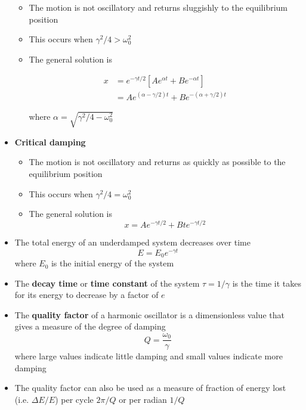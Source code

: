 \documentclass{article}
\begin{document}
\begin{itemize}
        \begin{itemize}
          \item The motion is not oscillatory and returns sluggishly to the equilibrium position

          \item This occurs when $\gamma^2 / 4 > \omega_0^2$

          \item The general solution is

                \begin{align*}
                  x & = e^{-\gamma t / 2} [A e^{\alpha t} + B e^{-\alpha t}]           \\
                    & = A e^{(\alpha - \gamma / 2) t} + B e^{-(\alpha + \gamma / 2) t}
                \end{align*}

                where $\alpha = \sqrt{\gamma^2 / 4 - \omega_0^2}$
        \end{itemize}

  \item \textbf{Critical damping}

        \begin{itemize}
          \item The motion is not oscillatory and returns as quickly as possible to the equilibrium position

          \item This occurs when $\gamma^2 / 4 = \omega_0^2$

          \item The general solution is \[x = A e^{-\gamma t / 2} + B t e^{-\gamma t / 2}\]
        \end{itemize}

  \item The total energy of an underdamped system decreases over time \[E = E_0 e^{-\gamma t}\] where $E_0$ is the initial energy of the system

  \item The \textbf{decay time} or \textbf{time constant} of the system $\tau = 1 / \gamma$ is the time it takes for its energy to decrease by a factor of $e$

  \item The \textbf{quality factor} of a harmonic oscillator is a dimensionless value that gives a measure of the degree of damping \[Q = \frac{\omega_0}{\gamma}\] where large values indicate little damping and small values indicate more damping

\item The quality factor can also be used as a measure of fraction of energy lost (i.e. $\Delta E / E$) per cycle $2 \pi / Q$ or per radian $1 / Q$
\end{itemize}
\end{document}
